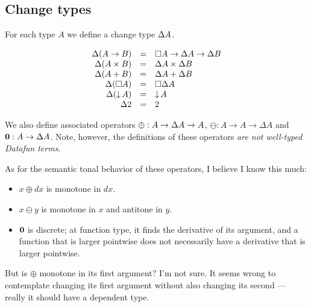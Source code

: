 \documentclass{article}
\begin{document}
\subsection{Change types}

For each type $A$ we define a change type $\Delta A$.

\[\begin{array}{rcl>{\quad\quad}rcl}
  \GD(A \to B) &=& \Disc{A} \to \Delta A \to \Delta B\\
  \GD(A \x B) &=& \GD A \x \GD B\\
  \GD(A + B) &=& \GD A + \GD B\\
  \GD(\Disc{A}) &=& \Disc{\GD A}\\
  \GD(\Down{A}) &=& \Down{A}\\
  \GD \tbool &=& \tbool
\end{array}\]

We also define associated operators $\oplus : A \to \Delta A \to A$, $\ominus : A
\to A \to \Delta A$ and $\mathbf{0} : A \to \Delta A$. Note, however, the
definitions of these operators \emph{are not well-typed Datafun terms}. 

As for the semantic tonal behavior of these operators, I believe I know this
much:
\begin{itemize}
\item $x \oplus dx$ is monotone in $dx$.
\item $x \ominus y$ is monotone in $x$ and antitone in $y$.
\item $\mathbf{0}$ is discrete; at function type, it finds the derivative of its
  argument, and a function that is larger pointwise does not necessarily have a
  derivative that is larger pointwise.
\end{itemize}

But is $\oplus$ monotone in its first argument? I'm not sure. It seems wrong to
contemplate changing its first argument without also changing its second ---
really it should have a dependent type.
\end{document}

